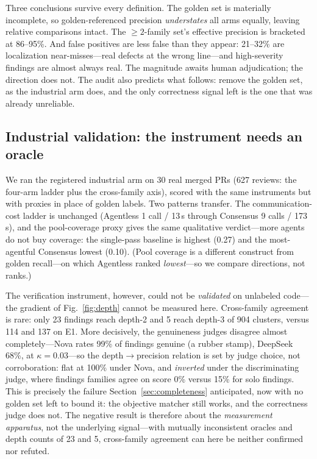 \documentclass[conference]{IEEEtran}
\begin{document}
Three conclusions survive every definition. The golden set is materially
incomplete, so golden-referenced precision \emph{understates} all arms equally,
leaving relative comparisons intact. The ${\geq}2$-family set's effective
precision is bracketed at 86--95\%. And false positives are less false than they
appear: 21--32\% are localization near-misses---real defects at the wrong
line---and high-severity findings are almost always real. The magnitude awaits
human adjudication; the direction does not. The audit also predicts what follows:
remove the golden set, as the industrial arm does, and the only correctness
signal left is the one that was already unreliable.

\subsection{Industrial validation: the instrument needs an oracle}
\label{sec:industrial}
We ran the registered industrial arm on 30 real merged PRs (627 reviews: the
four-arm ladder plus the cross-family axis), scored with the same instruments but
with proxies in place of golden labels. Two patterns transfer. The
communication-cost ladder is unchanged (Agentless 1 call / 13\,s through
Consensus 9 calls / 173\,s), and the pool-coverage proxy gives the same
qualitative verdict---more agents do not buy coverage: the single-pass baseline
is highest (0.27) and the most-agentful Consensus lowest (0.10). (Pool coverage
is a different construct from golden recall---on which Agentless ranked
\emph{lowest}---so we compare directions, not ranks.)

The verification instrument, however, could not be \emph{validated} on unlabeled
code---the gradient of Fig.~\ref{fig:depth} cannot be measured here. Cross-family
agreement is rare: only 23
findings reach depth-2 and 5 reach depth-3 of 904 clusters, versus 114 and 137 on
E1. More decisively, the genuineness judges disagree almost completely---Nova
rates 99\% of findings genuine (a rubber stamp), DeepSeek 68\%, at
$\kappa{=}0.03$---so the depth$\rightarrow$precision relation is set by judge
choice, not corroboration: flat at 100\% under Nova, and \emph{inverted} under
the discriminating judge, where findings families agree on score 0\% versus 15\%
for solo findings. This is precisely the failure
Section~\ref{sec:completeness} anticipated, now with no golden set left to bound
it: the objective matcher still works, and the correctness judge does not. The
negative result is therefore about the \emph{measurement apparatus}, not the
underlying signal---with mutually inconsistent oracles and depth counts of 23 and
5, cross-family agreement can here be neither confirmed nor refuted.
\end{document}
